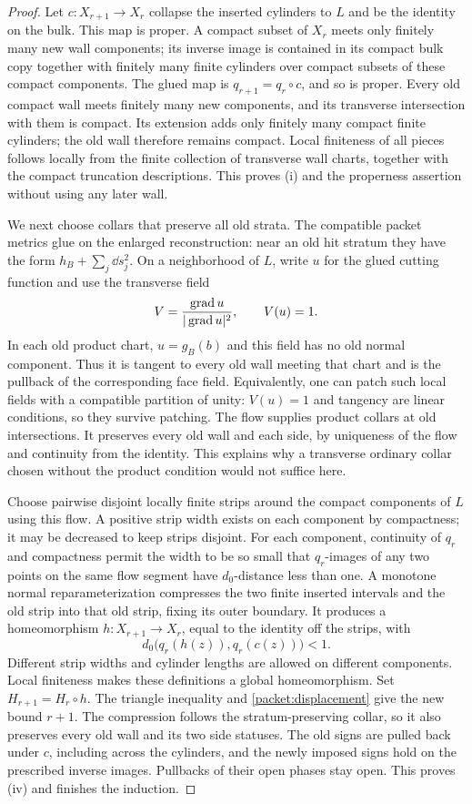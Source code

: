 \begin{proof}
Let $c:X_{r+1}\to X_r$ collapse the inserted cylinders to $L$ and be
the identity on the bulk.  This map is proper.  A compact subset of
$X_r$ meets only finitely many new wall components; its inverse image
is contained in its compact bulk copy together with finitely many
finite cylinders over compact subsets of these compact components.
The glued map is $q_{r+1}=q_r\circ c$, and so is proper.
Every old compact wall meets finitely many new components, and its
transverse intersection with them is compact.  Its extension adds
only finitely many compact finite cylinders; the old wall therefore
remains compact.  Local finiteness of all pieces follows locally
from the finite collection of transverse wall charts, together with
the compact truncation descriptions.  This proves (i) and the
properness assertion without using any later wall.

We next choose collars that preserve all old strata.  The compatible
packet metrics glue on the enlarged reconstruction: near an old hit
stratum they have the form $h_B+\sum_j\dd s_j^2$.  On a neighborhood
of $L$, write $u$ for the glued cutting function and use the transverse
field
\[
 V=\frac{\operatorname{grad} u}{|\operatorname{grad} u|^2},\qquad V(u)=1.
\]
In each old product chart, $u=g_B(b)$ and this field has no old normal
component.  Thus it is tangent to every old wall meeting that chart
and is the pullback of the corresponding face field.  Equivalently,
one can patch such local fields with a compatible partition of unity:
$V(u)=1$ and tangency are linear conditions, so they survive patching.
The flow supplies product collars at old intersections.  It preserves
every old wall and each side, by uniqueness of the flow and continuity
from the identity.  This explains why a transverse ordinary collar
chosen without the product condition would not suffice here.

Choose pairwise disjoint locally finite strips around the compact
components of $L$ using this flow.  A positive strip width exists on
each component by compactness; it may be decreased to keep strips
disjoint.  For each component, continuity of $q_r$ and compactness
permit the width to be so small that $q_r$-images of any two points
on the same flow segment have $d_0$-distance less than one.  A monotone normal
reparameterization compresses the two finite inserted intervals and
the old strip into that old strip, fixing its outer boundary.  It
produces a homeomorphism $h:X_{r+1}\to X_r$, equal to the identity
off the strips, with
\[
 d_0\bigl(q_r(h(z)),q_r(c(z))\bigr)<1.
\]
Different strip widths and cylinder lengths are allowed on different
components.  Local finiteness makes these definitions a global
homeomorphism.  Set $H_{r+1}=H_r\circ h$.  The triangle inequality
and \cref{packet:displacement} give the new bound $r+1$.
The compression follows the stratum-preserving collar, so it also
preserves every old wall and its two side statuses.  The old signs
are pulled back under $c$, including across the cylinders, and the
newly imposed signs hold on the prescribed inverse images.  Pullbacks
of their open phases stay open.  This
proves (iv) and finishes the induction.
\end{proof}

